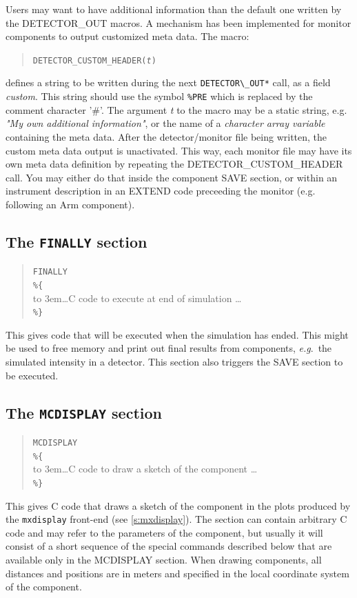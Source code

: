 Users may want to have additional information than the default one written by the DETECTOR\_OUT macros. A mechanism has been implemented for monitor components to output customized meta data. The macro:

\begin{quote}
  \texttt{DETECTOR\_CUSTOM\_HEADER(\textit{t})}
\end{quote}

defines a string to be written during the next \verb+DETECTOR\_OUT*+ call, as a field \textit{custom}. This string should use the symbol \verb+%PRE+ which is replaced by
the comment character '\#'. The argument \textit{t} to the macro may be a static string, e.g. \textit{"My own additional information"}, or the name of a \textit{character array variable} containing the meta data. After
the detector/monitor file being written, the custom meta data output is unactivated. This way, each monitor file may have its own meta data definition by repeating the
DETECTOR\_CUSTOM\_HEADER call. You may either do that inside the component SAVE section, or within an instrument description in an EXTEND code preceeding the monitor (e.g.
following an Arm component).

\subsection{The \texttt{FINALLY} section}
\label{s:comp-finally}

\begin{quote}
  \texttt{FINALLY} \\
  \verb|%{| \\
  \hbox to 3em{}\ldots C code to execute at end of simulation \ldots \\
  \verb|%}|
\end{quote}
This gives code that will be executed when the simulation has
ended. This might be used to free memory and print out final results from components, \textit{e.g}.\ the
simulated intensity in a detector. This section also triggers the SAVE section to be executed.

\subsection{The \texttt{MCDISPLAY} section}
\label{s:comp-mcdisplay}

\begin{quote}
  \texttt{MCDISPLAY} \\
  \verb|%{| \\
  \hbox to 3em{}\ldots C code to draw a sketch of the component \ldots \\
  \verb|%}|
\end{quote}
This gives C code that draws a sketch of the component in the plots
produced by the \verb+mxdisplay+ front-end (see
\cref{s:mxdisplay}). The section can contain arbitrary C code and
may refer to the parameters of the component, but usually it will
consist of a short sequence of the special commands described below that
are available only in the MCDISPLAY section.
When drawing components, all distances and positions are in meters and
specified in the local coordinate system of the component.

